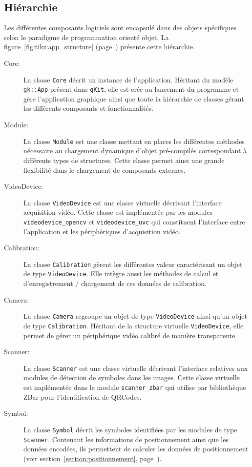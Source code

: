 \documentclass[10pt,a4paper,twoside, twocolumn]{report}
\newcommand*{\rootPath}{../}
\begin{document}
\subsection{Hiérarchie}

Les différentes composants logiciels sont encapsulé dans des objets spécifiques selon le paradigme de programmation orienté objet. La figure~\ref{fig:tikz:app_structure} (page~\pageref{fig:tikz:app_structure}) présente cette hiérarchie.
\begin{figure*}[ht!]
	\centering
	
	\caption{Structure de l’application}
	\label{fig:tikz:app_structure}
\end{figure*}

\begin{description}
	\item[Core:] La classe \texttt{Core} décrit un instance de l’application. Héritant du modèle \texttt{gk::App} présent dans \texttt{gKit}, elle est crée au lancement du programme et gère l’application graphique ainsi que toute la hiérarchie de classes gérant les différents composants et fonctionnalités.

	\item[Module:] La classe \texttt{Module} est une classe mettant en places les différentes méthodes nécessaire au chargement dynamique d’objet pré-compilés correspondant à différents types de structures. Cette classe permet ainsi une grande flexibilité dans le chargement de composants externes.

	\item[VideoDevice:] La classe \texttt{VideoDevice} est une classe virtuelle décrivant l’interface acquisition vidéo. Cette classe est implémentée par les modules \texttt{videodevice\_opencv} et \texttt{videodevice\_uvc} qui constituent l’interface entre l’application et les périphériques d’acquisition vidéo.
	\item[Calibration:] La classe \texttt{Calibration} gèrent les différentes valeur caractérisant un objet de type \texttt{VideoDevice}. Elle intègre aussi les méthodes de calcul et d’enregistrement / chargement de ces données de calibration.
	\item[Camera:] La classe \texttt{Camera} regroupe un objet de type \texttt{VideoDevice} ainsi qu’un objet de type \texttt{Calibration}. Héritant de la structure virtuelle \texttt{VideoDevice}, elle permet de gérer un périphérique vidéo calibré de manière transparente.

	\item[Scanner:] La classe \texttt{Scanner} est une classe virtuelle décrivant l’interface relatives aux modules de détection de symboles dans les images. Cette classe virtuelle est implémentée dans le module \texttt{scanner\_zbar} qui utilise par bibliothèque ZBar pour l’identification de QRCodes.
	\item[Symbol:] La classe \texttt{Symbol} décrit les symboles identifiées par les modules de type \texttt{Scanner}. Contenant les informations de positionnement ainsi que les données encodées, ils permettent de calculer les données de positionnement (voir section~\ref{section:positionnement}, page~\pageref{section:positionnement}).


\end{description}
\end{document}
